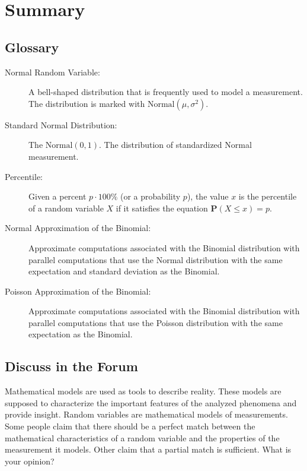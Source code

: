 \documentclass[
]{krantz}
\newcommand{\Prob}{\mathbf{P}}
\theoremstyle{definition}
\theoremstyle{definition}
\theoremstyle{definition}
\theoremstyle{remark}
\begin{document}
\hypertarget{summary-5}{%
\section{Summary}\label{summary-5}}

\hypertarget{glossary}{%
\subsection*{Glossary}\label{glossary}}


\begin{description}
\item[Normal Random Variable:]
A bell-shaped distribution that is frequently used to model a
measurement. The distribution is marked with
\(\mathrm{Normal}(\mu,\sigma^2)\).
\item[Standard Normal Distribution:]
The \(\mathrm{Normal}(0,1)\). The distribution of standardized Normal
measurement.
\item[Percentile:]
Given a percent \(p \cdot 100\%\) (or a probability \(p\)), the value
\(x\) is the percentile of a random variable \(X\) if it satisfies the
equation \(\Prob(X \leq x) = p\).
\item[Normal Approximation of the Binomial:]
Approximate computations associated with the Binomial distribution
with parallel computations that use the Normal distribution with the
same expectation and standard deviation as the Binomial.
\item[Poisson Approximation of the Binomial:]
Approximate computations associated with the Binomial distribution
with parallel computations that use the Poisson distribution with
the same expectation as the Binomial.
\end{description}

\hypertarget{discuss-in-the-forum}{%
\subsection*{Discuss in the Forum}\label{discuss-in-the-forum}}


Mathematical models are used as tools to describe reality. These models
are supposed to characterize the important features of the analyzed
phenomena and provide insight. Random variables are mathematical models
of measurements. Some people claim that there should be a perfect match
between the mathematical characteristics of a random variable and the
properties of the measurement it models. Other claim that a partial
match is sufficient. What is your opinion?
\end{document}
